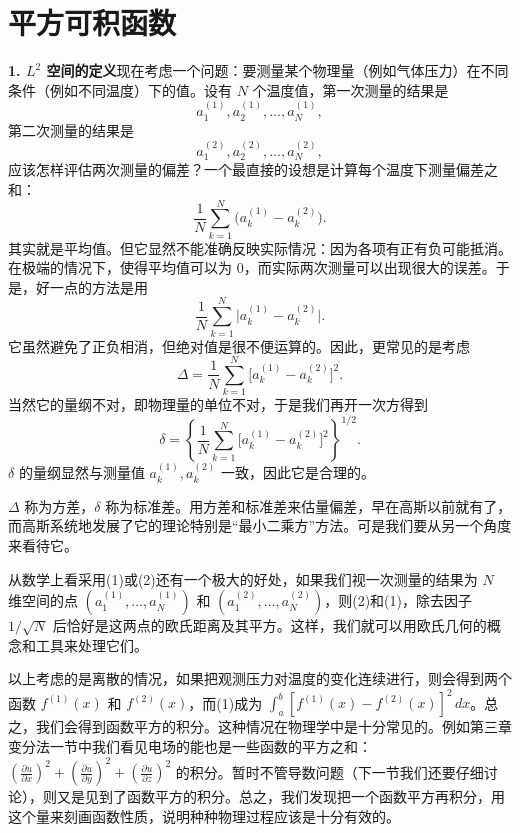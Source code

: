 \section{平方可积函数}

\noindent\textbf{1. $L^2$ 空间的定义}\quad 现在考虑一个问题：要测量某个物理量（例如气体压力）在不同条件（例如不同温度）下的值。设有 $N$ 个温度值，第一次测量的结果是
\[
 a_1^{(1)},a_2^{(1)},\ldots,a_N^{(1)},
\]
第二次测量的结果是
\[
 a_1^{(2)},a_2^{(2)},\ldots,a_N^{(2)},
\]
应该怎样评估两次测量的偏差？一个最直接的设想是计算每个温度下测量偏差之和：
\[
 \frac1N\sum_{k=1}^N\bigl(a_k^{(1)}-a_k^{(2)}\bigr).
\]
其实就是平均值。但它显然不能准确反映实际情况：因为各项有正有负可能抵消。在极端的情况下，使得平均值可以为 $0$，而实际两次测量可以出现很大的误差。于是，好一点的方法是用
\[
 \frac1N\sum_{k=1}^N\bigl|a_k^{(1)}-a_k^{(2)}\bigr|.
\]
它虽然避免了正负相消，但绝对值是很不便运算的。因此，更常见的是考虑
\begin{equation}
 \Delta=\frac1N\sum_{k=1}^N\bigl[a_k^{(1)}-a_k^{(2)}\bigr]^2.
 \tag{1}
\end{equation}
当然它的量纲不对，即物理量的单位不对，于是我们再开一次方得到
\begin{equation}
 \delta=\left\{\frac1N\sum_{k=1}^N\bigl[a_k^{(1)}-a_k^{(2)}\bigr]^2\right\}^{1/2}.
 \tag{2}
\end{equation}
$\delta$ 的量纲显然与测量值 $a_k^{(1)},a_k^{(2)}$ 一致，因此它是合理的。

$\Delta$ 称为方差，$\delta$ 称为标准差。用方差和标准差来估量偏差，早在高斯以前就有了，而高斯系统地发展了它的理论特别是“最小二乘方”方法。可是我们要从另一个角度来看待它。

从数学上看采用(1)或(2)还有一个极大的好处，如果我们视一次测量的结果为 $N$ 维空间的点 $(a_1^{(1)},\ldots,a_N^{(1)})$ 和 $(a_1^{(2)},\ldots,a_N^{(2)})$，则(2)和(1)，除去因子 $1/\sqrt N$ 后恰好是这两点的欧氏距离及其平方。这样，我们就可以用欧氏几何的概念和工具来处理它们。

以上考虑的是离散的情况，如果把观测压力对温度的变化连续进行，则会得到两个函数 $f^{(1)}(x)$ 和 $f^{(2)}(x)$，而(1)成为 $\int_a^b[f^{(1)}(x)-f^{(2)}(x)]^2\,dx$。总之，我们会得到函数平方的积分。这种情况在物理学中是十分常见的。例如第三章变分法一节中我们看见电场的能也是一些函数的平方之和：$\left(\frac{\partial u}{\partial x}\right)^2+\left(\frac{\partial u}{\partial y}\right)^2+\left(\frac{\partial u}{\partial z}\right)^2$ 的积分。暂时不管导数问题（下一节我们还要仔细讨论），则又是见到了函数平方的积分。总之，我们发现把一个函数平方再积分，用这个量来刻画函数性质，说明种种物理过程应该是十分有效的。

